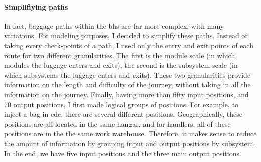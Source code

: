 \documentclass[12pt]{article}
\begin{document}
\paragraph{Simplifiying paths} In fact, baggage paths within the \acrshort{bhs} are far more complex, with many variations. For modeling purposes, I decided to simplify these paths. Instead of taking every check-points of a path, I used only the entry and exit points of each route for two different granularities. The first is the module scale (in which modules the luggage enters and exits), the second is the subsystem scale (in which subsystems the luggage enters and exits). These two granularities provide information on the length and difficulty of the journey, without taking in all the information on the journey. Finally, having more than fifty input positions, and 70 output positions, I first made logical groups of positions. For example, to inject a bag in \acrshort{edc}, there are several different positions. Geographically, these positions are all located in the same hangar, and for handlers, all of these positions are in the the same work warehouse. Therefore, it makes sense to reduce the amount of information by grouping input and output positions by subsystem. In the end, we have five input positions and the three main output positions. 
\end{document}
